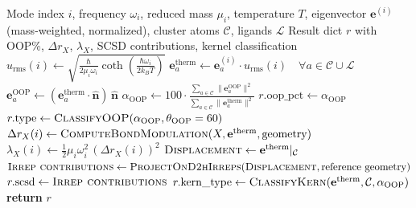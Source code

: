 \documentclass[11pt,a4paper,twoside]{article}
\theoremstyle{remark}
\begin{document}
\begin{algorithm}[H]
\caption{\textsc{AnalyzeMode}}
\begin{algorithmic}[1]
\Require Mode index $i$, frequency $\omega_i$, reduced mass $\mu_i$,
         temperature $T$, eigenvector $\mathbf{e}^{(i)}$
         (mass-weighted, normalized), cluster atoms $\mathcal{C}$,
         ligands $\mathcal{L}$
\Ensure Result dict $r$ with OOP\%, $\Delta r_X$, $\lambda_X$,
        SCSD contributions, kernel classification
\State {}
\State $u_\text{rms}(i) \gets \sqrt{\frac{\hbar}{2\mu_i\omega_i}
       \coth\!\left(\frac{\hbar\omega_i}{2 k_B T}\right)}$
\State $\mathbf{e}^\text{therm}_a \gets \mathbf{e}_a^{(i)} \cdot u_\text{rms}(i)
       \quad \forall a \in \mathcal{C} \cup \mathcal{L}$
\State {}
\State $\mathbf{e}_a^\text{OOP} \gets (\mathbf{e}^\text{therm}_a \cdot
       \hat{\mathbf{n}})\,\hat{\mathbf{n}}$
\State $\alpha_\text{OOP} \gets 100 \cdot
       \frac{\sum_{a\in\mathcal{C}} \|\mathbf{e}_a^\text{OOP}\|^2}
            {\sum_{a\in\mathcal{C}} \|\mathbf{e}^\text{therm}_a\|^2}$
\State $r.\text{oop\_pct} \gets \alpha_\text{OOP}$
\State $r.\text{type} \gets \textsc{ClassifyOOP}(\alpha_\text{OOP},
       \theta_\text{OOP}=60)$
\State {}
  \State $\Delta r_X(i) \gets \textsc{ComputeBondModulation}(X,
         \mathbf{e}^\text{therm}, \text{geometry})$
  \State $\lambda_X(i) \gets \tfrac{1}{2}\mu_i \omega_i^2 \,(\Delta r_X(i))^2$
\EndFor
\State {}
  \State $\textsc{Displacement} \gets \mathbf{e}^\text{therm}|_\mathcal{C}$
  \State $\textsc{Irrep contributions} \gets \textsc{ProjectOnD2hIrreps}(
         \textsc{Displacement}, \text{reference geometry})$
  \State $r.\text{scsd} \gets \textsc{Irrep contributions}$
\EndIf
\State {}
\State $r.\text{kern\_type} \gets \textsc{ClassifyKern}(\mathbf{e}^\text{therm},
       \mathcal{C}, \alpha_\text{OOP})$
\State \textbf{return} $r$
\end{algorithmic}
\end{algorithm}
\end{document}
